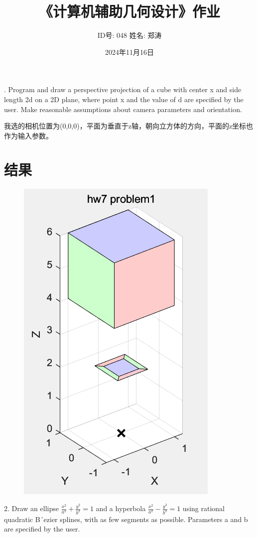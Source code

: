 \documentclass{article}
\begin{document}
	
	\title{《计算机辅助几何设计》作业}
	\author{ID号: 048  \qquad  姓名: 郑涛}  %
	\date{2024年11月16日}
	. Program and draw a perspective projection of a cube with center x and side length 2d on
	a 2D plane, where point x and the value of d are specified by the user. Make reasonable
	assumptions about camera parameters and orientation.
	
	我选的相机位置为(0,0,0)，平面为垂直于z轴，朝向立方体的方向，平面的z坐标也作为输入参数。
	\section*{结果}
	\begin{figure}[H]
		\centering
		\includegraphics[scale=0.5]{7_1}
		\label{fig:71}
	\end{figure}
	
	
	2. Draw an ellipse $\frac{x^2}{a^2}+\frac{y^2}{b^2}=1$ and a hyperbola $\frac{x^2}{a^2}-\frac{y^2}{b^2}=1$ using rational
	quadratic B´ezier splines, with as few segments as possible. Parameters a and b are
	specified by the user.
	
\end{document}
